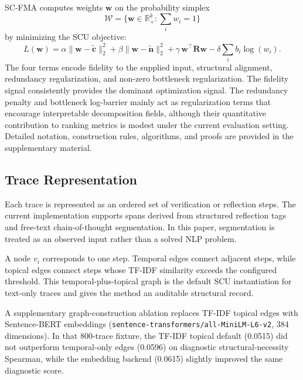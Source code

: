 \documentclass[a4paper,fleqn]{cas-sc}
\begin{document}
SC-FMA computes weights $\mathbf{w}$ on the probability simplex
\begin{equation}
\mathcal{W}=\{\mathbf{w}\in\mathbb{R}_{+}^{k}: \sum_i w_i = 1\}
\label{eq:scu-feasible-set}
\end{equation}
by minimizing the SCU objective:
\begin{equation}
L(\mathbf{w}) =
\alpha\|\mathbf{w} - \tilde{\mathbf{c}}\|_2^2
+ \beta\|\mathbf{w} - \tilde{\mathbf{n}}\|_2^2
+ \gamma\,\mathbf{w}^{\top}\mathbf{R}\mathbf{w}
- \delta\sum_i b_i \log(w_i).
\label{eq:scu}
\end{equation}
The four terms encode fidelity to the supplied input, structural alignment, redundancy regularization, and non-zero bottleneck regularization. The fidelity signal consistently provides the dominant optimization signal. The redundancy penalty and bottleneck log-barrier mainly act as regularization terms that encourage interpretable decomposition fields, although their quantitative contribution to ranking metrics is modest under the current evaluation setting. Detailed notation, construction rules, algorithms, and proofs are provided in the supplementary material.

\subsection{Trace Representation}

Each trace is represented as an ordered set of verification or reflection steps. The current implementation supports spans derived from structured reflection tags and free-text chain-of-thought segmentation. In this paper, segmentation is treated as an observed input rather than a solved NLP problem.

A node $v_i$ corresponds to one step. Temporal edges connect adjacent steps, while topical edges connect steps whose TF-IDF similarity exceeds the configured threshold. This temporal-plus-topical graph is the default SCU instantiation for text-only traces and gives the method an auditable structural record.

A supplementary graph-construction ablation replaces TF-IDF topical edges with Sentence-BERT embeddings (\texttt{sentence-transformers/all-MiniLM-L6-v2}, 384 dimensions). In that 800-trace fixture, the TF-IDF topical default (0.0515) did not outperform temporal-only edges (0.0596) on diagnostic structural-necessity Spearman, while the embedding backend (0.0615) slightly improved the same diagnostic score.
\end{document}
